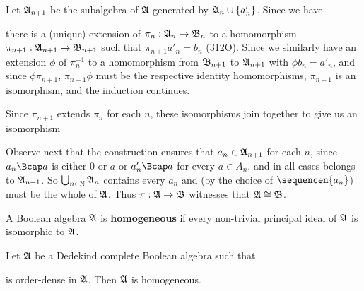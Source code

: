 {\noindent Let $\frak A_{n+1}$ be the subalgebra of $\frak A$ generated
by $\frak A_n\cup\{a'_n\}$.   Since we have


\noindent there is a (unique) extension of $\pi_n:\frak A_n\to\frak B_n$
to a homomorphism $\pi_{n+1}:\frak A_{n+1}\to\frak B_{n+1}$ such that
$\pi_{n+1}a'_n=b_n$ (312O).   Since we similarly  have an extension
$\phi$ of
$\pi_n^{-1}$ to a homomorphism from $\frak B_{n+1}$ to $\frak A_{n+1}$
with $\phi b_n=a'_n$, and since $\phi\pi_{n+1}$, $\pi_{n+1}\phi$ must be
the respective identity homomorphisms, $\pi_{n+1}$ is an isomorphism,
and the induction continues.

Since $\pi_{n+1}$ extends $\pi_n$ for each $n$, these isomorphisms join
together to give us an isomorphism


\noindent Observe next that the construction ensures that
$a_n\in\frak A_{n+1}$ for each $n$, since $a_n\Bcap a$ is either $0$ or
$a$ or $a'_n\Bcap a$ for every $a\in A_n$, and in all cases belongs to
$\frak A_{n+1}$.   So $\bigcup_{n\in\Bbb N}\frak A_n$ contains every
$a_n$ and
(by the choice of $\sequencen{a_n}$) must be the whole of $\frak A$.
Thus $\pi:\frak A\to\frak B$ witnesses that $\frak A\cong\frak B$.
}%

A Boolean algebra $\frak A$ is {\bf
homogeneous} if every non-trivial principal ideal of $\frak A$ is
isomorphic to $\frak A$.

 Let $\frak A$ be a Dedekind complete
Boolean algebra such that


\noindent is order-dense in $\frak A$.   Then $\frak A$ is homogeneous.


